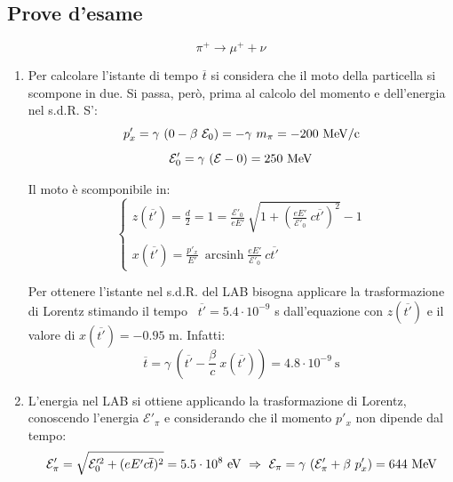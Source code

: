 \documentclass[12pt,twoside,a4]{article}
\DeclareMathOperator{\arcsinh}{arcsinh}
\begin{document}
\subsection{Prove d'esame}
\begin{solution}
\begin{equation}\label{eq: dec5.1}
    \pi^+ \rightarrow \mu^+ + \nu
\end{equation}
\begin{enumerate}[label=(\textit{\roman*})]
	\item Per calcolare l'istante di tempo $\overline{t}$ si considera che il moto della particella si scompone in due. Si passa, però, prima al calcolo del momento e dell'energia nel s.d.R. S': \begin{equation*}
   p'_x = \gamma \ (0 - \beta \ \mathcal{E}_0) = - \gamma \ m_\pi = - 200 \ \mathrm{\mathrm{MeV}/c}   
\end{equation*}
\vspace{-6mm}
\begin{equation*}
   \mathcal{E}'_0 = \gamma \ (\mathcal{E} - 0) = 250 \ \mathrm{MeV}   
\end{equation*}

Il moto è scomponibile in: 
\begin{equation*}
    \begin{cases}
    z(\overline{t'}) = \frac{d}{2} = 1 = \frac{\mathcal{E}'_0}{eE'} \ \sqrt{1+ \left(\frac{eE'}{\mathcal{E}'_0} \ c\overline{t'}\right)^2} -1 \\
    \\
    x(\overline{t'}) = \frac{p'_x}{E'} \ \arcsinh{\frac{eE'}{\mathcal{E}'_0} \ c\overline{t'}}  
    
    \end{cases}
\end{equation*}

\bigskip
Per ottenere l'istante nel s.d.R. del LAB bisogna applicare la trasformazione di Lorentz stimando il tempo \ $\overline{t'} = 5.4 \cdot 10^{-9}$ s dall'equazione con $z(\overline{t'})$ e il valore di $x(\overline{t'}) = -0.95 $ m.
Infatti: \begin{equation*}
    \overline{t} = \gamma \ \left(\overline{t'} - \frac{\beta}{c} \ x(\overline{t'}) \right) = 4.8 \cdot 10^{-9} \ \mathrm{s} 
\end{equation*}

 
\item  L'energia nel LAB si ottiene applicando la trasformazione di Lorentz, conoscendo l'energia $\mathcal{E}'_\pi$ e considerando che il momento $p'_x$ non dipende dal tempo:
\begin{equation*}
    \mathcal{E}'_\pi = \sqrt{\mathcal{E}'^2_0 + (eE'c\overline{t})^2} = 5.5 \cdot 10^{8} \ \mathrm{eV}  \  \Rightarrow  \  \mathcal{E}_\pi = \gamma \ (\mathcal{E}'_\pi + \beta \ p'_x) = 644 \ \mev 
\end{equation*}


\end{enumerate}
\end{solution}
\end{document}
